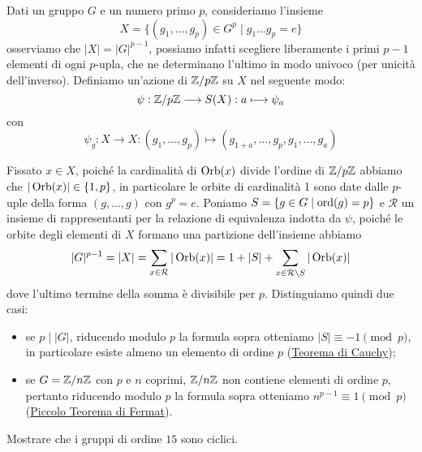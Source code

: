 \documentclass[11pt]{scrartcl}
\begin{document}
Dati un gruppo $G$ e un numero primo $p$, consideriamo l'insieme 
\[
    X = \{(g_1, \ldots, g_p) \in G^p\mid g_1\ldots g_p = e\}
\]osserviamo che $|X| = |G|^{p - 1}$, possiamo infatti scegliere liberamente
i primi $p - 1$ elementi di ogni $p$-upla, che ne determinano l'ultimo in 
modo univoco (per unicità dell'inverso). Definiamo un'azione di ${\mathbb Z}/p{\mathbb Z}$ su $X$
nel seguente modo:
\[
    \psi: {\mathbb Z}/p{\mathbb Z} \longrightarrow S(X) : a \longmapsto \psi_a
\]
con
\[
    \psi_g:X\longrightarrow X : (g_1, \ldots, g_p)\longmapsto (g_{1 + a}, \ldots, g_p, g_1, \ldots, g_a)
\]

Fissato $x \in X$, poiché la cardinalità di $\operatorname{Orb}(x)$ divide l'ordine di ${\mathbb Z}/p{\mathbb Z}$
abbiamo che $|\operatorname{Orb}(x)| \in \{1, p\}$, in particolare le orbite di cardinalità
1 sono date dalle $p$-uple della forma $(g, \ldots, g)$ con $g^p = e$.
Poniamo $S = \{g\in G \mid \operatorname{ord}(g) = p\}$ e $\mathcal{R}$ un insieme di 
rappresentanti per la relazione di equivalenza indotta da $\psi$, poiché 
le orbite degli elementi di $X$ formano una partizione dell'insieme abbiamo
\[
    |G|^{p - 1} = |X| = \sum_{x \in \mathcal{R}} |\operatorname{Orb}(x)| = 1 + |S| + \sum_{x \in \mathcal{R}\setminus S}|\operatorname{Orb}(x)|
\]dove l'ultimo termine della somma è divisibile per $p$. Distinguiamo 
quindi due casi:
\begin{itemize}
    \item se $p\mid |G|$, riducendo modulo $p$ la formula sopra otteniamo
    $|S| \equiv -1 \pmod p$, in particolare esiste almeno un elemento di
    ordine $p$ (\hyperref[teorema1.44]{Teorema di Cauchy});
    \item se $G = {\mathbb Z}/n{\mathbb Z}$ con $p$ e $n$ coprimi, ${\mathbb Z}/n{\mathbb Z}$ non contiene elementi
    di ordine $p$, pertanto riducendo modulo $p$ la formula sopra otteniamo
    $n^{p - 1} \equiv 1 \pmod p$ (\hyperref[teorema1.45]{Piccolo Teorema di Fermat}).
\end{itemize}

\begin{exercise}
    Mostrare che i gruppi di ordine $15$ sono ciclici.
\end{exercise}
\end{document}
